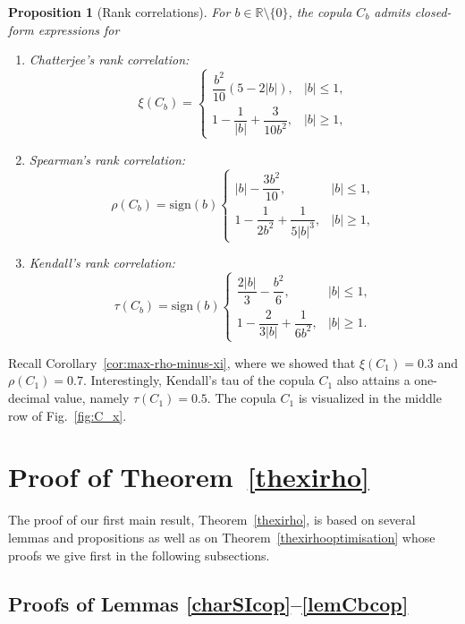 \documentclass{article}
\theoremstyle{plain}
\newtheorem{proposition}{Proposition}
\theoremstyle{definition}
\begin{document}
\begin{proposition}[Rank correlations]\label{propcfe}
For $b \in \mathbb{R} \setminus \{0\}$, the copula $C_b$ admits closed-form expressions for
\begin{enumerate}[label=(\roman*), font=\upshape]
    \item Chatterjee's rank correlation:
    \[
        \xi(C_b) =
        \begin{cases}
            \dfrac{b^2}{10}(5-2|b|), & |b| \le 1, \\[2.5ex]
            1 - \dfrac{1}{|b|} + \dfrac{3}{10b^2}, & |b| \ge 1,
        \end{cases}
    \]

    \item Spearman's rank correlation:
    \[
        \rho(C_b) = \mathrm{sign}(b)
        \begin{cases}
            |b| - \dfrac{3b^2}{10}, & |b| \le 1, \\[2.5ex]
            1 - \dfrac{1}{2b^2} + \dfrac{1}{5|b|^3}, & |b| \ge 1,
        \end{cases}
    \]
    
    \item Kendall's rank correlation:
    \[
        \tau(C_b) = \mathrm{sign}(b)
        \begin{cases}
            \dfrac{2|b|}{3} - \dfrac{b^2}{6}, & |b| \le 1, \\[2.5ex]
            1 - \dfrac{2}{3|b|} + \dfrac{1}{6b^2}, & |b| \ge 1.
        \end{cases}
    \]
\end{enumerate}
\end{proposition}

Recall Corollary~\ref{cor:max-rho-minus-xi}, where we showed that \(\xi(C_1)=0.3\) and \(\rho(C_1)=0.7\).
Interestingly, Kendall’s tau of the copula \(C_1\) also attains a one-decimal value, namely \(\tau(C_1)=0.5\).
The copula \(C_1\) is visualized in the middle row of Fig.~\ref{fig:C_x}.

\section{Proof of Theorem~\ref{thexirho}}\label{sec5}

The proof of our first main result, Theorem~\ref{thexirho}, is based on several lemmas and propositions as well as on Theorem~\ref{thexirhooptimisation} whose proofs we give first in the following subsections.

\subsection{Proofs of Lemmas \ref{charSIcop}--\ref{lemCbcop}}
\end{document}

